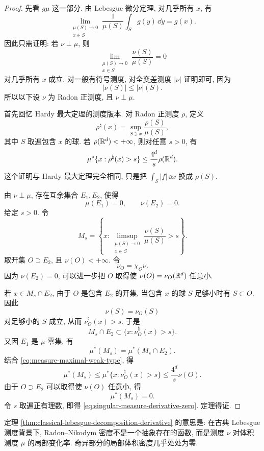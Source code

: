 \begin{proof}
	先看 \(g\mu\) 这一部分. 由 Lebesgue 微分定理, 对几乎所有 \(x\), 有
	\[
	\lim_{\substack{\mu(S)\to0\\x\in S}}
	\frac{1}{\mu(S)}\int_S g(y)\,\dd y=g(x).
	\]
	因此只需证明: 若 \(\nu\perp\mu\), 则
	\begin{equation}
		\lim_{\substack{\mu(S)\to0\\x\in S}}
		\frac{\nu(S)}{\mu(S)}=0
		\label{eq:singular-measure-derivative-zero}
	\end{equation}
	对几乎所有 \(x\) 成立. 对一般有符号测度, 对全变差测度 \(|\nu|\) 证明即可, 因为
	\[
	|\nu(S)|\leq |\nu|(S).
	\]
	所以以下设 \(\nu\) 为 Radon 正测度, 且 \(\nu\perp\mu\).
	
	首先回忆 Hardy 最大定理的测度版本. 对 Radon 正测度 \(\rho\), 定义
	\[
	\rho^\natural(x)=
	\sup_{S\ni x}\frac{\rho(S)}{\mu(S)},
	\]
	其中 \(S\) 取遍包含 \(x\) 的球. 若 \(\rho(\mathbb{R}^d)<+\infty\), 则对任意 \(s>0\), 有
	\begin{equation}
		\mu^*\{x:\rho^\natural(x)>s\}
		\leq
		\frac{4^d}{s}\rho(\mathbb{R}^d).
		\label{eq:measure-maximal-weak-type}
	\end{equation}
	这个证明与 Hardy 最大定理完全相同, 只是把 \(\int_S |f|\,\dd x\) 换成 \(\rho(S)\).
	
	由 \(\nu\perp\mu\), 存在互余集合 \(E_1,E_2\), 使得
	\[
	\mu(E_1)=0,
	\qquad
	\nu(E_2)=0.
	\]
	给定 \(s>0\). 令
	\[
	M_s=
	\left\{x:
	\limsup_{\substack{\mu(S)\to0\\x\in S}}
	\frac{\nu(S)}{\mu(S)}>s
	\right\}.
	\]
	取开集 \(O\supset E_2\), 且 \(\nu(O)<+\infty\). 令
	\[
	\nu_O=\chi_O\nu.
	\]
	因为 \(\nu(E_2)=0\), 可以进一步把 \(O\) 取得使 \(\nu(O)=\nu_O(\mathbb{R}^d)\) 任意小.
	
	若 \(x\in M_s\cap E_2\), 由于 \(O\) 是包含 \(E_2\) 的开集, 当包含 \(x\) 的球 \(S\) 足够小时有 \(S\subset O\). 因此
	\[
	\nu(S)=\nu_O(S)
	\]
	对足够小的 \(S\) 成立, 从而 \(\nu_O^\natural(x)>s\). 于是
	\[
	M_s\cap E_2\subset \{x:\nu_O^\natural(x)>s\}.
	\]
	又因 \(E_1\) 是 \(\mu\)-零集, 有
	\[
	\mu^*(M_s)=\mu^*(M_s\cap E_2).
	\]
	结合 \eqref{eq:measure-maximal-weak-type}, 得
	\[
	\mu^*(M_s)
	\leq
	\mu^*\{x:\nu_O^\natural(x)>s\}
	\leq
	\frac{4^d}{s}\nu(O).
	\]
	由于 \(O\supset E_2\) 可以取得使 \(\nu(O)\) 任意小, 得
	\[
	\mu^*(M_s)=0.
	\]
	令 \(s\) 取遍正有理数, 即得 \eqref{eq:singular-measure-derivative-zero}. 定理得证.
\end{proof}

\begin{rem}
	定理 \ref{thm:classical-lebesgue-decomposition-derivative} 的意思是: 在古典 Lebesgue 测度背景下, Radon--Nikodym 密度不是一个抽象存在的函数, 而是测度 \(\nu\) 对体积测度 \(\mu\) 的局部变化率. 奇异部分的局部体积密度几乎处处为零.
\end{rem}

